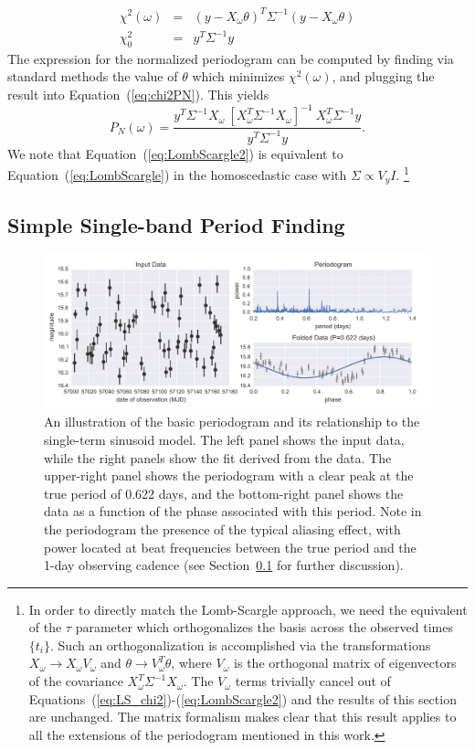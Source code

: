 \documentclass{emulateapj}
\newcommand{\figlabel}[1]{\label{fig:#1}}
\newcommand{\Eq}[1]{Equation~(\ref{eq:#1})}
\newcommand{\eq}[1]{\Eq{#1}}
\newcommand{\eqs}[2]{Equations~(\ref{eq:#1})-(\ref{eq:#2})}
\newcommand{\eqlabel}[1]{\label{eq:#1}}
\newcommand{\Sect}[1]{Section~\ref{sect:#1}}
\newcommand{\sect}[1]{\Sect{#1}}
\newcommand{\sectlabel}[1]{\label{sect:#1}}
\newcommand{\new}[1]{{\color{red} #1}}
\begin{document}
\begin{eqnarray}
  \eqlabel{LS_chi2}
  \chi^2(\omega) &=& (y - X_\omega\theta)^T\Sigma^{-1}(y - X_\omega\theta)\\
  \chi^2_0 &=& y^T \Sigma^{-1} y
\end{eqnarray}
The expression for the normalized periodogram can be computed by finding via standard methods the value of $\theta$ which minimizes $\chi^2(\omega)$, and plugging the result into \eq{chi2PN}. This yields
\begin{equation}
  \eqlabel{LombScargle2}
  P_N(\omega) = \frac{y^T\Sigma^{-1}X_\omega~[X_\omega^T\Sigma^{-1}X_\omega]^{-1}~X_\omega^T\Sigma^{-1}y}{y^T\Sigma^{-1}y}.
\end{equation}
We note that \eq{LombScargle2} is equivalent to \eq{LombScargle} in the homoscedastic case with $\Sigma \propto V_y I$.
\footnote{\new{In order to directly match the Lomb-Scargle approach, we need the equivalent of the $\tau$ parameter which orthogonalizes the basis across the observed times $\{t_i\}$.
Such an orthogonalization is accomplished via the transformations $X_\omega \to X_\omega V_\omega$ and $\theta \to V_\omega^T \theta$, where $V_\omega$ is the orthogonal matrix of eigenvectors of the covariance $X_\omega^T \Sigma^{-1} X_\omega$.
The $V_\omega$ terms trivially cancel out of \eqs{LS_chi2}{LombScargle2} and the results of this section are unchanged.
The matrix formalism makes clear that this result applies to all the extensions of the periodogram mentioned in this work.}\label{footnote:ortho2}}


\subsection{Simple Single-band Period Finding}
\sectlabel{simple_period}

\begin{figure}
  \centering
  \includegraphics[width=\textwidth]{fig01.pdf}
  \caption{
    An illustration of the basic periodogram and its relationship to the single-term sinusoid model. The left panel shows the input data, while the right panels show the fit derived from the data. The upper-right panel shows the periodogram with a clear peak at the true period of 0.622 days, and the bottom-right panel shows the data as a function of the phase associated with this period. Note in the periodogram the presence of the typical aliasing effect, with power located at beat frequencies between the true period and the 1-day observing cadence (see \sect{simple_period} for further discussion).
  }
  \figlabel{basic_example}
\end{figure}
\end{document}
